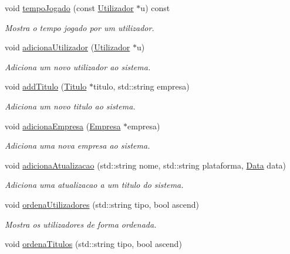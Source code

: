 \begin{DoxyCompactItemize}
void \mbox{\hyperlink{class_sistema_a871ba21f5de12adb05106f0fcaf9d723}{tempo\+Jogado}} (const \mbox{\hyperlink{class_utilizador}{Utilizador}} $\ast$u) const
\begin{DoxyCompactList}\small\item\em Mostra o tempo jogado por um utilizador. \end{DoxyCompactList}\item 
void \mbox{\hyperlink{class_sistema_a51beac85364444837cd4cdff0080bad5}{adiciona\+Utilizador}} (\mbox{\hyperlink{class_utilizador}{Utilizador}} $\ast$u)
\begin{DoxyCompactList}\small\item\em Adiciona um novo utilizador ao sistema. \end{DoxyCompactList}\item 
void \mbox{\hyperlink{class_sistema_a1136080a3cf835831bf94908d419ae42}{add\+Titulo}} (\mbox{\hyperlink{class_titulo}{Titulo}} $\ast$titulo, std\+::string empresa)
\begin{DoxyCompactList}\small\item\em Adiciona um novo titulo ao sistema. \end{DoxyCompactList}\item 
void \mbox{\hyperlink{class_sistema_a41eddc54d36ac140608dd259c085ba88}{adiciona\+Empresa}} (\mbox{\hyperlink{class_empresa}{Empresa}} $\ast$empresa)
\begin{DoxyCompactList}\small\item\em Adiciona uma nova empresa ao sistema. \end{DoxyCompactList}\item 
void \mbox{\hyperlink{class_sistema_aa91f2955f6b47f4dc0523b86b94c6309}{adiciona\+Atualizacao}} (std\+::string nome, std\+::string plataforma, \mbox{\hyperlink{class_data}{Data}} data)
\begin{DoxyCompactList}\small\item\em Adiciona uma atualizacao a um titulo do sistema. \end{DoxyCompactList}\item 
void \mbox{\hyperlink{class_sistema_ac3b36e6798c903dd0efd102d7a5dd081}{ordena\+Utilizadores}} (std\+::string tipo, bool ascend)
\begin{DoxyCompactList}\small\item\em Mostra os utilizadores de forma ordenada. \end{DoxyCompactList}\item 
void \mbox{\hyperlink{class_sistema_a6dcecc2ca65f6fdedd042c7431d5ea19}{ordena\+Titulos}} (std\+::string tipo, bool ascend)

\end{DoxyCompactItemize}
